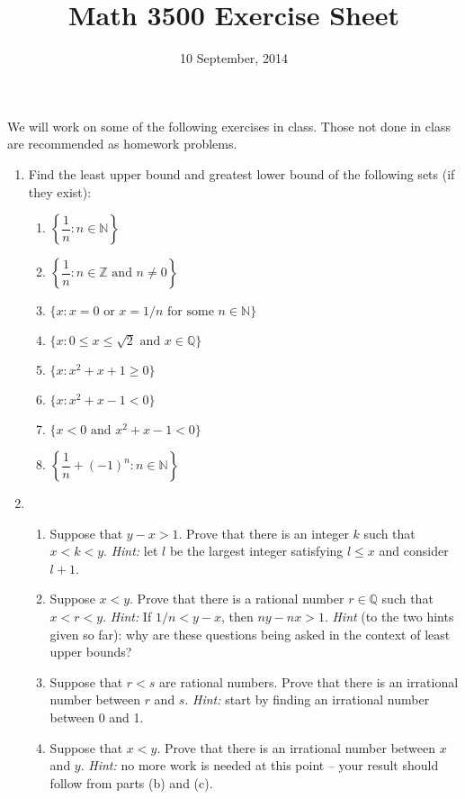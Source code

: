 \documentclass[letterpaper,12pt]{article}
\title{Math 3500 Exercise Sheet}
\date{10 September, 2014}
\newcommand{\N}{\mathbb{N}}
\newcommand{\Q}{\mathbb{Q}}
\newcommand{\R}{\mathbb{R}}
\begin{document}
\maketitle

We will work on some of the following exercises in class. Those not done in class are recommended as homework problems.
\begin{enumerate}
 \item Find the least upper bound and greatest lower bound of the following sets (if they exist):
\begin{enumerate}
 \item $\left\{\dfrac{1}{n} : n\in \N\right\}$
 \item $\left\{\dfrac{1}{n} : n \in \mathbb{Z} \text{ and } n\neq 0\right\}$
 \item $\{x : x=0 \text{ or } x=1/n \text{ for some } n\in \N\}$
 \item $\{x : 0\leq x\leq \sqrt{2} \text{ and } x\in\Q\}$
 \item $\{x : x^2+x+1 \geq 0\}$
 \item $\{x: x^2+x-1<0\}$
 \item $\{x<0 \text{ and } x^2+x-1<0\}$
 \item $\left\{\dfrac{1}{n}+(-1)^n : n\in \N\right\}$
\end{enumerate}
 \item \begin{enumerate}
        \item Suppose that $y-x>1$. Prove that there is an integer $k$ such that $x<k<y$. {\em Hint:} let $l$ be the largest integer satisfying $l\leq x$ and consider $l+1$.
        \item Suppose $x<y$. Prove that there is a rational number $r\in\Q$ such that $x<r<y$. {\em Hint:} If $1/n<y-x$, then $ny-nx>1$. {\em Hint} (to the two hints given so far): why are these questions being asked in the context of least upper bounds?
	\item Suppose that $r<s$ are rational numbers. Prove that there is an irrational number between $r$ and $s$. {\em Hint:} start by finding an irrational number between 0 and 1.
	\item Suppose that $x<y$. Prove that there is an irrational number between $x$ and $y$. {\em Hint:} no more work is needed at this point -- your result should follow from parts (b) and (c).
       \end{enumerate}

\end{enumerate}
\end{document}
